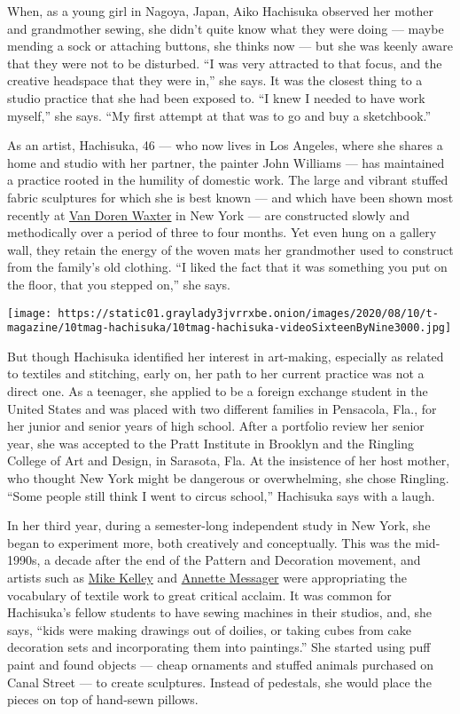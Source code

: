 When, as a young girl in Nagoya, Japan, Aiko Hachisuka observed her
mother and grandmother sewing, she didn't quite know what they were
doing --- maybe mending a sock or attaching buttons, she thinks now ---
but she was keenly aware that they were not to be disturbed. ``I was
very attracted to that focus, and the creative headspace that they were
in,'' she says. It was the closest thing to a studio practice that she
had been exposed to. ``I knew I needed to have work myself,'' she says.
``My first attempt at that was to go and buy a sketchbook.''

As an artist, Hachisuka, 46 --- who now lives in Los Angeles, where she
shares a home and studio with her partner, the painter John Williams ---
has maintained a practice rooted in the humility of domestic work. The
large and vibrant stuffed fabric sculptures for which she is best known
--- and which have been shown most recently at
\href{https://www.vandorenwaxter.com/}{Van Doren Waxter} in New York ---
are constructed slowly and methodically over a period of three to four
months. Yet even hung on a gallery wall, they retain the energy of the
woven mats her grandmother used to construct from the family's old
clothing. ``I liked the fact that it was something you put on the floor,
that you stepped on,'' she says.

\texttt{[image: https://static01.graylady3jvrrxbe.onion/images/2020/08/10/t-magazine/10tmag-hachisuka/10tmag-hachisuka-videoSixteenByNine3000.jpg]}

But though Hachisuka identified her interest in art-making, especially
as related to textiles and stitching, early on, her path to her current
practice was not a direct one. As a teenager, she applied to be a
foreign exchange student in the United States and was placed with two
different families in Pensacola, Fla., for her junior and senior years
of high school. After a portfolio review her senior year, she was
accepted to the Pratt Institute in Brooklyn and the Ringling College of
Art and Design, in Sarasota, Fla. At the insistence of her host mother,
who thought New York might be dangerous or overwhelming, she chose
Ringling. ``Some people still think I went to circus school,'' Hachisuka
says with a laugh.

In her third year, during a semester-long independent study in New York,
she began to experiment more, both creatively and conceptually. This was
the mid-1990s, a decade after the end of the Pattern and Decoration
movement, and artists such as
\href{https://www.nytimes3xbfgragh.onion/2012/02/02/arts/design/mike-kelley-influential-american-artist-dies-at-57.html}{Mike
Kelley} and
\href{https://www.nytimes3xbfgragh.onion/2007/06/25/arts/25iht-messager.1.6316141.html}{Annette
Messager} were appropriating the vocabulary of textile work to great
critical acclaim. It was common for Hachisuka's fellow students to have
sewing machines in their studios, and, she says, ``kids were making
drawings out of doilies, or taking cubes from cake decoration sets and
incorporating them into paintings.'' She started using puff paint and
found objects --- cheap ornaments and stuffed animals purchased on Canal
Street --- to create sculptures. Instead of pedestals, she would place
the pieces on top of hand-sewn pillows.

